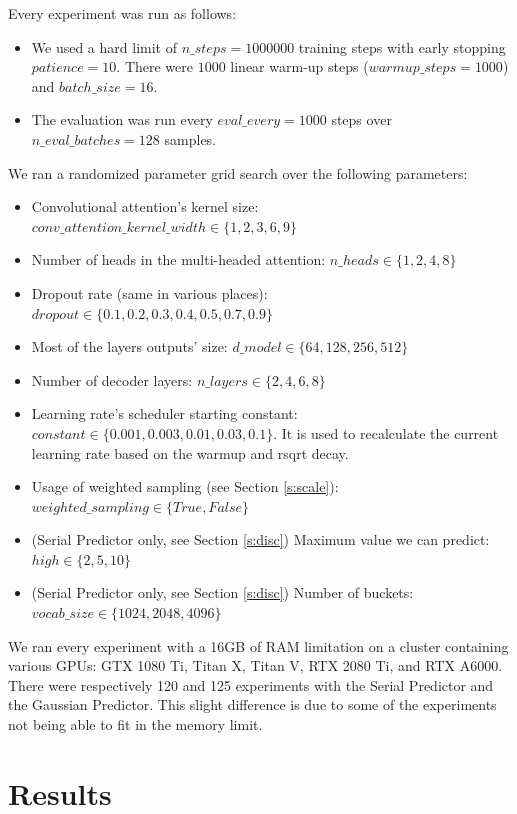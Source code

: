 \documentclass[en]{pracamgr}
\begin{document}
	
	Every experiment was run as follows:
	\begin{itemize}
		\item We used a hard limit of $n\_steps = 1000000$ training steps with early stopping $patience = 10$. There were $1000$ linear warm-up steps  ($warmup\_steps = 1000$) and $batch\_size = 16$.
		\item The evaluation was run every $eval\_every = 1000$ steps over $n\_eval\_batches = 128$ samples.
	\end{itemize}
	We ran a randomized parameter grid search over the following parameters:
	\begin{itemize}
		\item Convolutional attention's kernel size: $conv\_attention\_kernel\_width \in \{ 1, 2, 3, 6, 9 \}$
		\item Number of heads in the multi-headed attention: $ n\_heads \in \{ 1, 2, 4, 8 \} $
		\item Dropout rate (same in various places): $dropout \in \{ 0.1, 0.2, 0.3, 0.4, 0.5, 0.7, 0.9 \} $
		\item Most of the layers outputs' size: $d\_model \in \{ 64, 128, 256, 512 \} $
		\item Number of decoder layers: $n\_layers \in \{ 2, 4, 6, 8 \}$
		\item Learning rate's scheduler starting constant: $constant \in \{ 0.001, 0.003, 0.01, 0.03, 0.1 \}$. It is used to recalculate the current learning rate based on the warmup and rsqrt decay.
		\item Usage of weighted sampling (see Section \ref{s:scale}): $weighted\_sampling \in \{ True, False \}$
		\item (Serial Predictor only, see Section \ref{s:disc}) Maximum value we can predict: $high \in \{2, 5, 10\}$ 
		\item (Serial Predictor only, see Section \ref{s:disc}) Number of buckets: $vocab\_size \in \{1024, 2048, 4096\}$ 
	\end{itemize}
	
	We ran every experiment with a 16GB of RAM limitation on a cluster containing various GPUs: GTX 1080 Ti, Titan X, Titan V, RTX 2080 Ti, and RTX A6000.
	There were respectively 120 and 125 experiments with the Serial Predictor and the Gaussian Predictor. This slight difference is due to some of the experiments not being able to fit in the memory limit.
	
	
	\section{Results}
	
\end{document}

